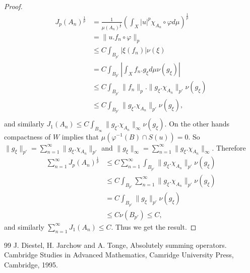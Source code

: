 \documentclass[10pt,a4paper]{amsart}
\begin{document}
\begin{proof}
\begin{align*}
J_p(A_n)^{\frac{1}{p}}&=\frac{1}{\mu(A_n)^{\frac{1}{p}}}\left(\int_X|u|^p\chi_{A_n}\circ\varphi d\mu\right)^{\frac{1}{p}}\\
&=\|u.f_n\circ\varphi\|_p\\
&\leq C\int_{B_{p'}}|\xi(f_n)|\nu(\xi)\\
&=C\int_{B_{p'}}|\int_X f_n.g_{\xi}d\mu\nu(g_{\xi})|\\
&\leq C \int_{B_{p'}}\|f_n\|_p.\|g_{\xi}.\chi_{A_n}\|_{p'}\nu(g_{\xi})\\
&\leq C\int_{B_{p'}}\|g_{\xi}.\chi_{A_n}\|_{p'}\nu(g_{\xi}),\\
\end{align*}
and similarly $J_1(A_n)\leq C\int_{B_{\infty}}\|g_{\xi}.\chi_{A_n}\|_{\infty}\nu(g_{\xi})$. On the other hands compactness of $W$ implies that $\mu(\varphi^{-1}(B)\cap S(u))=0$. So $\|g_{\xi}\|_{p'}=\sum^{\infty}_{n=1}\|g_{\xi}.\chi_{A_n}\|_{p'}$ and $\|g_{\xi}\|_{\infty}=\sum^{\infty}_{n=1}\|g_{\xi}.\chi_{A_n}\|_{\infty}$. Therefore
\begin{align*}
\sum^{\infty}_{n=1}J_p(A_n)^{\frac{1}{p}}&\leq C\sum^{\infty}_{n=1}\int_{B_{p'}}\|g_{\xi}.\chi_{A_n}\|_{p'}\nu(g_{\xi})\\
&\leq C\int_{B_{p'}}\sum^{\infty}_{n=1}\|g_{\xi}.\chi_{A_n}\|_{p'}\nu(g_{\xi})\\
&=C\int_{B_{p'}}\|g_{\xi}\|_{p'}\nu(g_{\xi})\\
&\leq C\nu(B_{p'})\leq C,
\end{align*}
and similarly $\sum^{\infty}_{n=1}J_1(A_n)\leq C$.
Thus we get the result.
\end{proof}

\begin{thebibliography}{99}
 J. Diestel, H. Jarchow and A. Tonge, Absolutely summing operators. Cambridge Studies in Advanced Mathematics, Camridge University Press, Cambridge, 1995.
\end{thebibliography}
\end{document}
